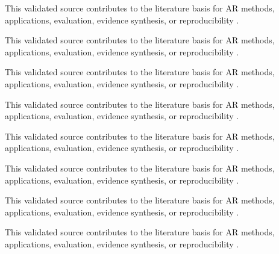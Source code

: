 \documentclass[journal]{IEEEtran}
\begin{document}
This validated source contributes to the literature basis for AR methods, applications, evaluation, evidence synthesis, or reproducibility \cite{Palmarini2018Maintenance,Gattullo2022VisualAssets,Wang2016Assembly,Baroroh2021SmartManufacturing,Ho2022QualityControl}.

This validated source contributes to the literature basis for AR methods, applications, evaluation, evidence synthesis, or reproducibility \cite{Breitkreuz2022RemoteMaintenance,Page2021PRISMA,Rethlefsen2021PRISMAS,McGowan2016PRESS,Bramer2016Deduplication}.

This validated source contributes to the literature basis for AR methods, applications, evaluation, evidence synthesis, or reproducibility \cite{Bramer2017DatabaseCombinations,Tang2020MedicalEducation,Tene2024MedicalUmbrella,RodriguezAbad2021HealthSciences,Lauinger2026XRHealthEducation}.

This validated source contributes to the literature basis for AR methods, applications, evaluation, evidence synthesis, or reproducibility \cite{Chiang2022VocationalTraining,FernandezDelAmo2018KnowledgeTransfer,Burke2025XRHigherEducation,Williams2025AnatomyAR,Fugate2025ImmersiveXRMedical}.

This validated source contributes to the literature basis for AR methods, applications, evaluation, evidence synthesis, or reproducibility \cite{FernandezMoyano2025IndustryImpact,Haq2026SurgicalTraining,Jia2025StrokeARMeta,Alashram2025StrokeLowerLimbAR,Su2024TKAExtendedReality}.

This validated source contributes to the literature basis for AR methods, applications, evaluation, evidence synthesis, or reproducibility \cite{Plavoukou2025KneeRehabilitation,Bello2025NeurocognitiveXR,Williamson2025SCIExtendedReality,Nikolaidis2022ReviewOfReviews,Gonzales2025NonTechnicalHealthcareXR}.

This validated source contributes to the literature basis for AR methods, applications, evaluation, evidence synthesis, or reproducibility \cite{Asoodar2024HealthProfessionsLearning,Mondal2024IndiaHealthcareEducation,Chahartangi2025ARVirtualPatients,Li2025ARHigherEducationMeta,Roman2024HealthSciencesTeaching}.

This validated source contributes to the literature basis for AR methods, applications, evaluation, evidence synthesis, or reproducibility \cite{Shidende2023AccessibilityEvaluation,Upadhyay2024CollaborativeHigherEducation,Stefanidi2024AROnTheMove,Zilak2022HandheldAccessibility,Egger2020IntelligentManufacturing}.
\end{document}
